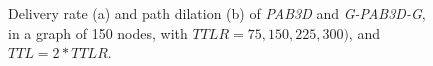 \documentclass[journal,comsoc]{IEEEtran}
\begin{document}
\begin{figure}[!t]
\centering



\caption{Delivery rate (a) and path dilation (b) of \emph{PAB3D} and \emph{G-PAB3D-G}, in a graph of 150 nodes, with \(TTLR = 75, 150, 225, 300)\), and \(TTL = 2 * TTLR\).}
\label{fig:change_TTLR}
\end{figure}
\end{document}

